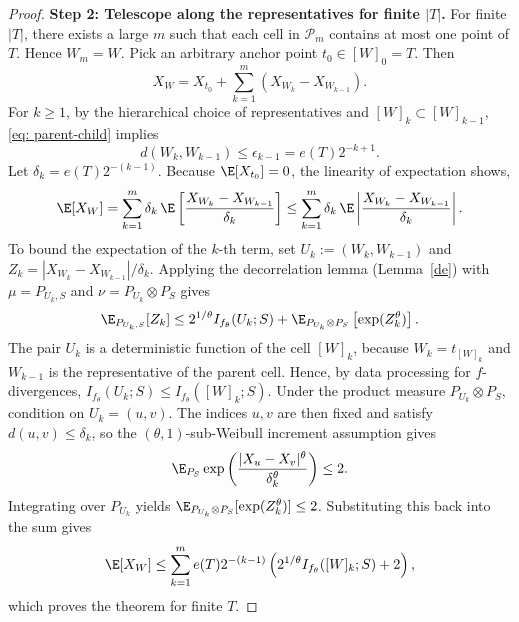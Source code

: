 \documentclass[11pt]{article}
\begin{document}
\begin{proof}
\textbf{Step 2: Telescope along the representatives for finite \( |T| \).}
For finite $|T|$, there exists a large $m$ such that each cell in $\mathcal{P}_m$ contains at most one point of $T$. Hence $W_{m}=W$. Pick an arbitrary anchor point $t_0 \in [W]_0=T$. Then
\[
X_W = X_{t_0} + \sum_{k=1}^{m}(X_{W_k}-X_{W_{k-1}}).
\]
For $k \geq 1$, by the hierarchical choice of representatives and $[W]_k \subset [W]_{k-1}$, \eqref{eq: parent-child} implies
\[
    d(W_{k}, W_{{k-1}})\le \epsilon_{k-1} = e(T)2^{-k+1}.
\]
Let $\delta_k = e(T)2^{-(k-1)}$. Because $\E[X_{t_0}] = 0$, the linearity of expectation shows,
\[
    \E[X_W] = \sum_{k=1}^m \delta_k \, \E \left[ \frac{X_{W_{k}} - X_{W_{{k-1}}}}{\delta_k} \right]\le \sum_{k=1}^m \delta_k \, \E \left| \frac{X_{W_{k}} - X_{W_{{k-1}}}}{\delta_k} \right|.
\]
To bound the expectation of the $k$-th term, set
$U_k:=(W_k,W_{k-1})$ and
$Z_k=|X_{W_k}-X_{W_{k-1}}|/\delta_k$. Applying the decorrelation lemma
(Lemma~\ref{de}) with $\mu=P_{U_k,S}$ and
$\nu=P_{U_k}\otimes P_S$ gives
\[
  \E_{P_{U_k,S}}[Z_k]
  \le
  2^{1/\theta} I_{f_\theta}(U_k; S)
  + \E_{P_{U_k}\otimes P_S} \left[ \exp(Z_k^\theta) \right].
\]
The pair $U_k$ is a deterministic function of the cell $[W]_k$, because
$W_k=t_{[W]_k}$ and $W_{k-1}$ is the representative of the parent cell.
Hence, by data processing for $f$-divergences,
$I_{f_\theta}(U_k;S)\le I_{f_\theta}([W]_k;S)$. Under the product measure
$P_{U_k}\otimes P_S$, condition on $U_k=(u,v)$. The indices $u,v$ are then
fixed and satisfy $d(u,v)\le\delta_k$, so the $(\theta,1)$-sub-Weibull
increment assumption gives
\[
    \E_{P_S}\exp\left(\frac{|X_u-X_v|^\theta}{\delta_k^\theta}\right)\le 2.
\]
Integrating over $P_{U_k}$ yields
$\E_{P_{U_k}\otimes P_S}[\exp(Z_k^\theta)]\le 2$. Substituting this back into
the sum gives
\[
    \E[X_W] \le \sum_{k=1}^m e(T)2^{-(k-1)} \left( 2^{1/\theta} I_{f_\theta}([W]_k; S) + 2 \right),
\]
which proves the theorem for finite $T$.


\end{proof}
\end{document}
